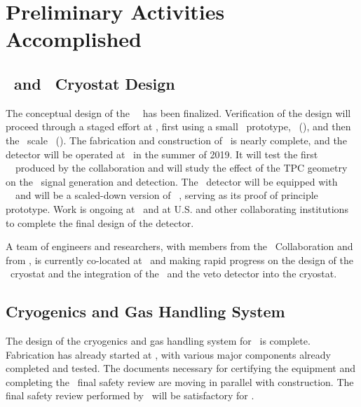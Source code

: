 \section{Preliminary Activities Accomplished}
\label{sec:PreActivities}


\subsection{\LArTPC\ and \pDUNE\ Cryostat Design}
\label{sec:TPC-Cryostat}

The conceptual design of the \DSks\ \LArTPC\ has been finalized.  Verification of the design will proceed through a staged effort at \CERN, first using a small \DSzApproximateMass\ prototype, \DSz\ (\DSzs), and then the \DSpApproximateMass\ scale \DSp\ (\DSps). The fabrication and construction of \DSzs\ is nearly complete, and the detector will be operated at \CERN\ in the summer of 2019. It will test the first \DSkPdmsFirstBatchNumber~\DSkPdms\ produced by the collaboration and will study the effect of the TPC geometry on the \STwo\ signal generation and detection.  The \DSps\ detector will be equipped with \DSkPdmsSecondBatchNumber~\DSkPdms\ and will be a scaled-down version of \DSks\ \LArTPC, serving as its proof of principle prototype. Work is ongoing at \CERN\ and at U.S. and other collaborating institutions to complete the final design of the detector.

A team of engineers and researchers, with members from the \GADMC\ Collaboration and from \CERN, is currently co-located at \CERN\ and making rapid progress on the design of the \pDUNE\ cryostat and the integration of the \LArTPC\ and the veto detector into the cryostat.

\subsection{Cryogenics and Gas Handling System}
\label{sec:Cryogenics}

The design of the cryogenics and gas handling system for \DSks\ is complete.  Fabrication has already started at \CERN, with various major components already completed and tested. The documents necessary for certifying the equipment and completing the \CERN\ final safety review are moving in parallel with construction. The final safety review performed by \CERN\ will be satisfactory for \LNGS.


